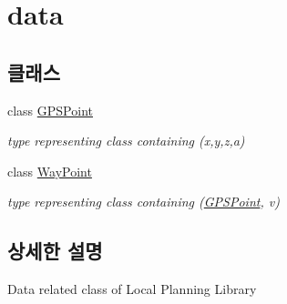 \hypertarget{group___data_group}{}\section{data}
\label{group___data_group}
\subsection*{클래스}
\begin{DoxyCompactItemize}
\item 
class \hyperlink{class_g_p_s_point}{G\+P\+S\+Point}
\begin{DoxyCompactList}\small\item\em type representing class containing (x,y,z,a) \end{DoxyCompactList}\item 
class \hyperlink{class_way_point}{Way\+Point}
\begin{DoxyCompactList}\small\item\em type representing class containing (\hyperlink{class_g_p_s_point}{G\+P\+S\+Point}, v) \end{DoxyCompactList}\end{DoxyCompactItemize}


\subsection{상세한 설명}
Data related class of Local Planning Library 
